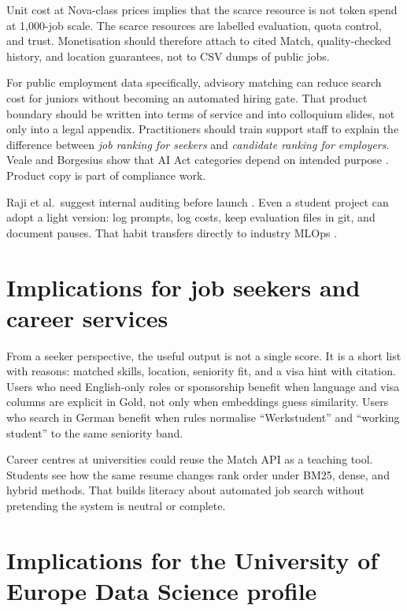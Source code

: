 Unit cost at Nova-class prices implies that the scarce resource is not token spend at 1{,}000-job scale. The scarce resources are labelled evaluation, quota control, and trust. Monetisation should therefore attach to cited Match, quality-checked history, and location guarantees, not to CSV dumps of public jobs.

For public employment data specifically, advisory matching can reduce search cost for juniors without becoming an automated hiring gate. That product boundary should be written into terms of service and into colloquium slides, not only into a legal appendix. Practitioners should train support staff to explain the difference between \emph{job ranking for seekers} and \emph{candidate ranking for employers}. Veale and Borgesius show that AI Act categories depend on intended purpose . Product copy is part of compliance work.

Raji et al.\ suggest internal auditing before launch . Even a student project can adopt a light version: log prompts, log costs, keep evaluation files in git, and document pauses. That habit transfers directly to industry MLOps .

\section{Implications for job seekers and career services}
\label{sec:seeker-impl}

From a seeker perspective, the useful output is not a single score. It is a short list with reasons: matched skills, location, seniority fit, and a visa hint with citation. Users who need English-only roles or sponsorship benefit when language and visa columns are explicit in Gold, not only when embeddings guess similarity. Users who search in German benefit when rules normalise ``Werkstudent'' and ``working student'' to the same seniority band.

Career centres at universities could reuse the Match API as a teaching tool. Students see how the same resume changes rank order under BM25, dense, and hybrid methods. That builds literacy about automated job search without pretending the system is neutral or complete.

\section{Implications for the University of Europe Data Science profile}
\label{sec:ue-impl}


